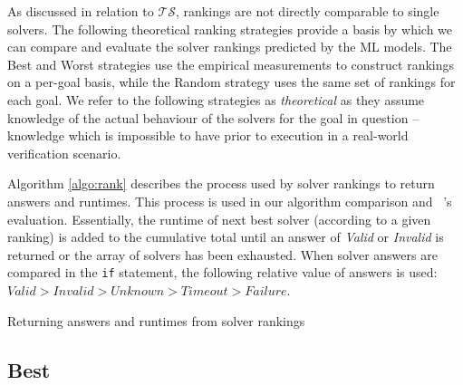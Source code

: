 As discussed in relation to $\mathcal{TS}$, rankings are not directly comparable to single solvers. 
The following theoretical ranking strategies provide a basis by which we can compare and evaluate the solver rankings predicted by the ML models.
The \textsf{Best} and \textsf{Worst} strategies use the empirical measurements to construct rankings on a per-goal basis, while the \textsf{Random} strategy uses the same set of rankings for each goal.
We refer to the following strategies as \textit{theoretical} as they assume knowledge of the actual behaviour of the solvers for the goal in question -- knowledge which is impossible to have prior to execution in a real-world verification scenario.     

Algorithm \ref{algo:rank} describes the process used by solver rankings to return answers and runtimes. This process is used in our algorithm comparison and \where~'s evaluation.
Essentially, the runtime of next best solver (according to a given ranking) is added to the cumulative total until an answer of \textit{Valid} or \textit{Invalid} is returned or the array of solvers has been exhausted. 
When solver answers are compared in the \texttt{if} statement, the following relative value of answers is used: $Valid > Invalid > Unknown > Timeout > Failure$.

\begin{algorithm}
	\caption{Returning answers and runtimes from solver rankings}
	\label{algo:rank}
	
\end{algorithm}

\subsection{\textsf{Best}}
\label{sub:best}

